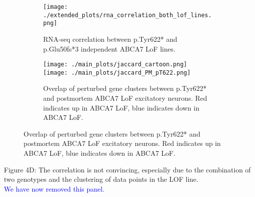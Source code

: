 \begin{figure}[H] 
	\centering
	\begin{subfigure}[t]{.4\textwidth}
		\caption{RNA-seq correlation between p.Tyr622* and p.Glu50fs*3 independent ABCA7 LoF lines.}
        \vspace{2cm}
		\texttt{[image: ./extended\_plots/rna\_correlation\_both\_lof\_lines.png]}        
	\end{subfigure} 
    \hspace{1cm}
    \begin{subfigure}[t]{0.4\textwidth}
		\caption{Overlap of perturbed gene clusters between p.Tyr622* and postmortem ABCA7 LoF excitatory neurons. Red indicates up in ABCA7 LoF, blue indicates down in ABCA7 LoF.}
        \vspace{1cm}
        \centering
        \texttt{[image: ./main\_plots/jaccard\_cartoon.png]}        
        \texttt{[image: ./main\_plots/jaccard\_PM\_pT622.png]}        
    \end{subfigure}  
\end{figure}

Figure 4D: The correlation is not convincing, especially due to the combination of two genotypes and the clustering of data points in the LOF line.\\
\textcolor{blue}{We have now removed this panel.}

